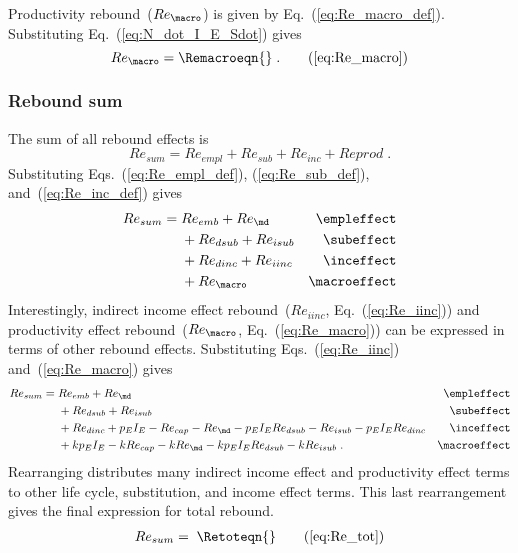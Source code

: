 \subsubsection{\Macroeffect{}} 
\label{sec:Re_prod}

Productivity rebound~($Re_{\macro}$) is given by Eq.~(\ref{eq:Re_macro_def}).
Substituting Eq.~(\ref{eq:N_dot_I_E_Sdot}) gives
%
\begin{equation}
  Re_{\macro} = \Remacroeqn{} \; . \tag{\ref{eq:Re_macro}}
\end{equation}


\subsubsection{Rebound sum} 
\label{sec:total_rebound}

The sum of all rebound effects is 
%
\begin{equation}
  Re_{sum} = Re_{empl} + Re_{sub} + Re_{inc} + Re{prod} \; .
\end{equation}
%
Substituting Eqs.~(\ref{eq:Re_empl_def}), (\ref{eq:Re_sub_def}), and~(\ref{eq:Re_inc_def}) gives
%
\begin{align}
  Re_{sum} = \; &Re_{emb} + Re_{\md}      & \mathrm{\empleffect} \nonumber \\
                &+ Re_{dsub} + Re_{isub}   & \mathrm{\subeffect}  \nonumber \\
                &+ Re_{dinc} + Re_{iinc}   & \mathrm{\inceffect}  \nonumber \\
                &+ Re_{\macro}               & \mathrm{\macroeffect}
\end{align}
%
Interestingly, 
indirect income effect rebound~($Re_{iinc}$, Eq.~(\ref{eq:Re_iinc})) and
productivity effect rebound~($Re_{\macro}$, Eq.~(\ref{eq:Re_macro}))
can be expressed in terms of other rebound effects.
Substituting Eqs.~(\ref{eq:Re_iinc}) and~(\ref{eq:Re_macro}) gives
%
\begin{align}
  Re_{sum} = \; &Re_{emb} + Re_{\md}      & \mathrm{\empleffect}                           \nonumber \\
                &+ Re_{dsub} + Re_{isub}   & \mathrm{\subeffect}                            \nonumber \\
                &+ Re_{dinc} + p_E I_E - Re_{cap} - Re_{\md} - p_E I_E Re_{dsub} 
                             - Re_{isub} - p_E I_E Re_{dinc}   & \mathrm{\inceffect}        \nonumber \\
                &+ k p_E I_E - k Re_{cap} - k Re_{\md} - k p_E I_E Re_{dsub} - k Re_{isub} \; .  & \mathrm{\macroeffect}
\end{align}
%
Rearranging distributes many indirect income effect and productivity effect terms 
to other life cycle, substitution, and income effect terms.
This last rearrangement gives the final expression for total rebound.
%
\begin{align}
  Re_{sum} = \; \Retoteqn{} \tag{\ref{eq:Re_tot}}
\end{align}

